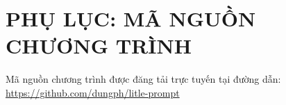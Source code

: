 \documentclass{report}
\begin{document}
\newpage








\renewcommand\bibname{TÀI LIỆU THAM KHẢO}





\chapter*{\hfill PHỤ LỤC: MÃ NGUỒN CHƯƠNG TRÌNH\hfill}

Mã nguồn chương trình được đăng tải trực tuyến tại đường dẫn: \url{https://github.com/dungph/litle-prompt}


\end{document}
